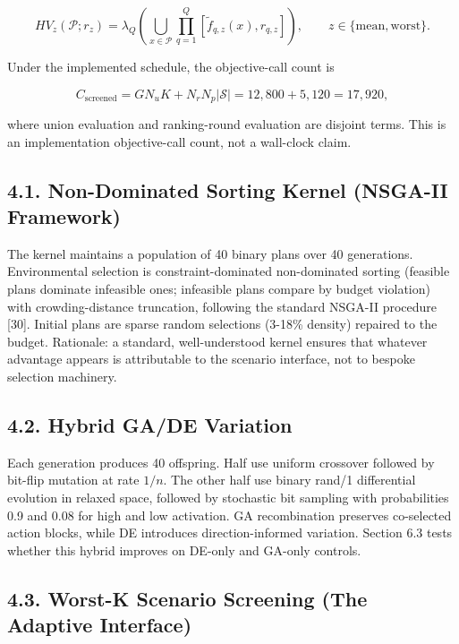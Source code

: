 \documentclass[
  10pt,
  a4paper,
]{article}
\begin{document}
\[
HV_z(\mathcal P;r_z)=\lambda_Q\!\left(
\bigcup_{x\in\mathcal P}\prod_{q=1}^{Q}
[\tilde f_{q,z}(x),r_{q,z}]\right),\qquad
z\in\{\mathrm{mean},\mathrm{worst}\}.
\]

Under the implemented schedule, the objective-call count is

\[
C_{\mathrm{screened}}=GN_uK+N_rN_p|\mathcal S|=12{,}800+5{,}120=17{,}920,
\]

where union evaluation and ranking-round evaluation are disjoint terms.
This is an implementation objective-call count, not a wall-clock claim.

\subsection{4.1. Non-Dominated Sorting Kernel (NSGA-II
Framework)}\label{non-dominated-sorting-kernel-nsga-ii-framework}

The kernel maintains a population of 40 binary plans over 40
generations. Environmental selection is constraint-dominated
non-dominated sorting (feasible plans dominate infeasible ones;
infeasible plans compare by budget violation) with crowding-distance
truncation, following the standard NSGA-II procedure {[}30{]}. Initial
plans are sparse random selections (3-18\% density) repaired to the
budget. Rationale: a standard, well-understood kernel ensures that
whatever advantage appears is attributable to the scenario interface,
not to bespoke selection machinery.

\subsection{4.2. Hybrid GA/DE Variation}\label{hybrid-gade-variation}

Each generation produces 40 offspring. Half use uniform crossover
followed by bit-flip mutation at rate \(1/n\). The other half use binary
rand/1 differential evolution in relaxed space, followed by stochastic
bit sampling with probabilities 0.9 and 0.08 for high and low
activation. GA recombination preserves co-selected action blocks, while
DE introduces direction-informed variation. Section 6.3 tests whether
this hybrid improves on DE-only and GA-only controls.

\subsection{4.3. Worst-K Scenario Screening (The Adaptive
Interface)}\label{worst-k-scenario-screening-the-adaptive-interface}
\end{document}
